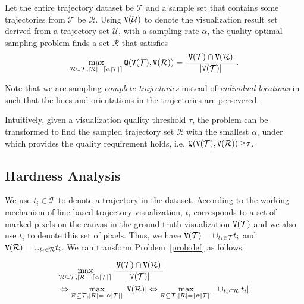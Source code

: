 \begin{problem}\label{prob:def}
Let the entire trajectory dataset be $\mathcal{T}$ and a sample set that contains some trajectories from $\mathcal{T}$ be $\mathcal{R}$.
Using $\mathtt{V}(\mathcal{U})$ to denote the visualization result set derived from a trajectory set $\mathcal{U}$, with a sampling rate $\alpha$,
the quality optimal sampling problem finds a set $\mathcal{R}$ that satisfies
	\begin{equation}\label{eq:opp}
	\max_{\mathcal{R} \subseteq \mathcal{T}, |\mathcal{R}| = \lceil \alpha |\mathcal{T}| \rceil} \QQ(\VV(\mathcal{T}), \VV(\mathcal{R}))=\frac{|\VV(\mathcal{T}) \cap \VV(\mathcal{R})|}{|\VV(\mathcal{T})|}.
	\end{equation}
\end{problem}
Note that we are sampling \textit{complete trajectories} instead of \textit{individual locations} in \prob{} such that the lines and orientations in the trajectories are persevered.

Intuitively, given a visualization quality threshold $\tau$, the \prob{} problem can be transformed to find the sampled trajectory set $\mathcal{R}$ with the smallest $\alpha$,
under which provides the quality requirement holds, i.e, $\mathtt{Q}(\mathtt{V}(\mathcal{T}), \mathtt{V}(\mathcal{R})) \!\ge\! \tau$.




\subsection{Hardness Analysis}\label{sec:hard}
We use $t_i\! \in \! \mathcal{T}$ to denote a trajectory in the dataset.
According to the working mechanism of line-based trajectory visualization, $t_i$ corresponds to a set of marked pixels on the canvas in the ground-truth visualization $\mathtt{V}(\mathcal{T})$ and we also use $t_i$ to denote this set of pixels.
Thus, we have $\mathtt{V}(\mathcal{T}) = \cup_{t_i \in \mathcal{T}} t_i$ and $\mathtt{V}(\mathcal{R}) = \cup_{t_i \in \mathcal{R}} t_i$.
We can transform Problem~\ref{prob:def} as follows:

\begin{align}\label{eqn:obj2}
& \max_{\oR \subseteq \D, |\oR| = \lceil \alpha |\mathcal{T}| \rceil}  \frac{|\VV(\mathcal{T}) \cap \VV(\mathcal{R})|}{|\VV(\mathcal{T})|} \\ \nonumber
& \Leftrightarrow \max_{\oR \subseteq \D, |\oR| = \lceil \alpha |\mathcal{T}| \rceil}   |\VV(\oR)|   %
 \Leftrightarrow \max_{\oR \subseteq \D, |\oR| = \lceil \alpha |\mathcal{T}| \rceil} | \cup_{t_i \in \oR} t_i |.
\end{align}

